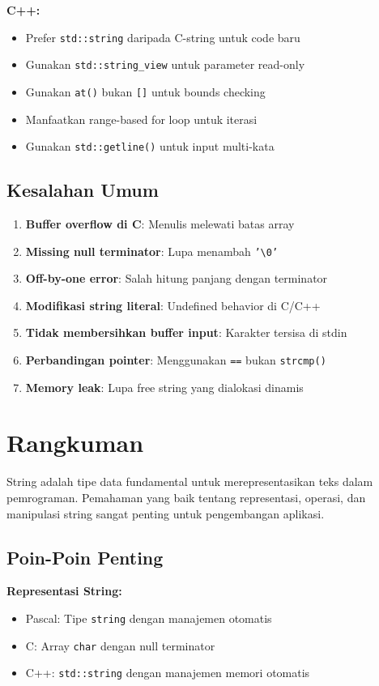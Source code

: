 \documentclass[../main.tex]{subfiles}
\begin{document}
\textbf{C++:}
\begin{itemize}
  \item Prefer \texttt{std::string} daripada C-string untuk code baru
  \item Gunakan \texttt{std::string\_view} untuk parameter read-only
  \item Gunakan \texttt{at()} bukan \texttt{[]} untuk bounds checking
  \item Manfaatkan range-based for loop untuk iterasi
  \item Gunakan \texttt{std::getline()} untuk input multi-kata
\end{itemize}

\subsection{Kesalahan Umum}

\begin{enumerate}
  \item \textbf{Buffer overflow di C}: Menulis melewati batas array
  \item \textbf{Missing null terminator}: Lupa menambah \texttt{'\textbackslash 0'}
  \item \textbf{Off-by-one error}: Salah hitung panjang dengan terminator
  \item \textbf{Modifikasi string literal}: Undefined behavior di C/C++
  \item \textbf{Tidak membersihkan buffer input}: Karakter tersisa di stdin
  \item \textbf{Perbandingan pointer}: Menggunakan \texttt{==} bukan \texttt{strcmp()}
  \item \textbf{Memory leak}: Lupa free string yang dialokasi dinamis
\end{enumerate}

\section{Rangkuman}

String adalah tipe data fundamental untuk merepresentasikan teks dalam pemrograman. Pemahaman yang baik tentang representasi, operasi, dan manipulasi string sangat penting untuk pengembangan aplikasi.

\subsection{Poin-Poin Penting}

\textbf{Representasi String:}
\begin{itemize}
  \item Pascal: Tipe \texttt{string} dengan manajemen otomatis
  \item C: Array \texttt{char} dengan null terminator
  \item C++: \texttt{std::string} dengan manajemen memori otomatis
\end{itemize}
\end{document}
